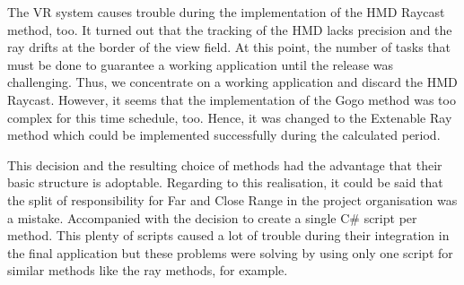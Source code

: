 The VR system causes trouble during the implementation of the HMD Raycast method, too. It turned out that the tracking of the HMD lacks precision and the ray drifts at the border of the view field. At this point, the number of tasks that must be done to guarantee a working application until the release was challenging. Thus, we concentrate on a working application and discard the HMD Raycast. However, it seems that the implementation of the Gogo method was too complex for this time schedule, too. Hence, it was changed to the Extenable Ray method which could be implemented successfully during the calculated period. 

This decision and the resulting choice of methods had the advantage that their basic structure is adoptable. Regarding to this realisation, it could be said that the split of responsibility for Far and Close Range in the project organisation was a mistake. Accompanied with the decision to create a single C\# script per method. This plenty of scripts caused a lot of trouble during their integration in the final application but these problems were solving by using only one script for similar methods like the ray methods, for example.

\newpage

























